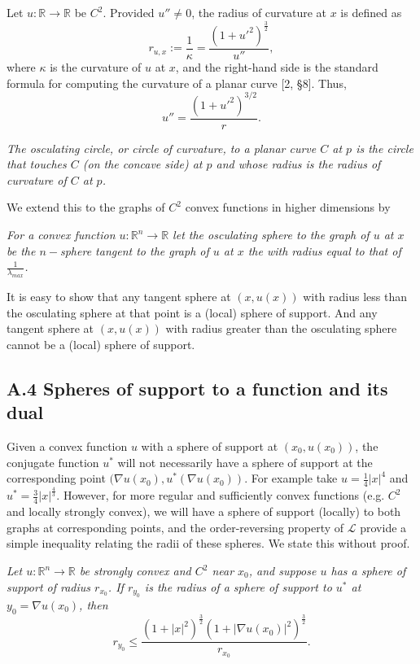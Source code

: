 \documentclass[10pt]{article}
\newenvironment{proposition}[2][Proposition]{\begin{trivlist}
\item[\hskip \labelsep {\bfseries #1}\hskip \labelsep {\bfseries #2.}]}{\end{trivlist}}
\newenvironment{definition}[2][Definition]{\begin{trivlist}
\item[\hskip \labelsep {\bfseries #1}\hskip \labelsep {\bfseries #2.}]}{\end{trivlist}}
\begin{document}
Let $u:\mathbb{R}\rightarrow \mathbb{R}$ be $C^{2}$. Provided $u''\neq 0$, the radius of curvature at $x$ is defined as
$$r_{u,x}:= \dfrac{1}{\kappa}= \dfrac{(1 + u'^{2})^{\frac{3}{2}}}{u''},$$
where $\kappa$ is the curvature of $u$ at $x$, and the right-hand side is the standard formula for computing the curvature of a planar curve [2, \S 8]. Thus, $$u''=\frac{(1+ u'^2)^{3/2}}{r}.$$

\begin{definition}{A.3}
\textit{The osculating circle, or circle of curvature, to a planar curve $C$ at $p$ is the circle that touches $C$ (on the concave side) at $p$ and whose radius is the radius of curvature of $C$ at $p$.} 
\end{definition}
We extend this to the graphs of $C^2$ convex functions in higher dimensions by
\begin{definition}{A.4}
\textit{For a convex function $u:\mathbb{R}^{n}\rightarrow \mathbb{R}$ let the osculating sphere to the graph of $u$ at $x$ be the $n-$sphere tangent to the graph of $u$ at $x$ the with radius equal to that of $\frac{1}{\lambda_{max}}$.}
\end{definition}
It is easy to show that any tangent sphere at $(x,u(x))$ with radius less than the osculating sphere at that point is a (local) sphere of support. And any tangent sphere at $(x,u(x))$ with radius greater than the osculating sphere cannot be a (local) sphere of support.
\subsection{A.4 Spheres of support to a function and its dual}
Given a convex function $u$ with a sphere of support at $(x_0, u(x_0))$, the conjugate function $u^*$ will not necessarily have a sphere of support at the corresponding point $(\nabla u(x_0), u^*(\nabla u(x_0))$. For example take $u=\frac{1}{4}|x|^4$ and $u^*=\frac{3}{4}|x|^{\frac{4}{3}}$. However, for more regular and sufficiently convex functions (e.g. $C^2$ and locally strongly convex), we will have a sphere of support (locally) to both graphs at corresponding points, and the order-reversing property of $\mathscr{L}$ provide a simple inequality relating the radii of these spheres. We state this without proof.

\begin{proposition} {A.5}
\textit{Let $u:\mathbb{R}^n \rightarrow \mathbb{R}$ be strongly convex and $C^2$ near $x_0$, and suppose $u$ has a sphere of support of radius $r_{x_0}$. If $r_{y_0}$ is the radius of a sphere of support to $u^*$ at $y_0=\nabla u(x_0)$, then
$$
r_{y_0}\leq \dfrac{\left(1+|x|^{2}\right)^{\frac{3}{2}} \left(1+|\nabla u(x_0)|^{2} \right)^{\frac{3}{2}}}{r_{x_0}}.
$$}
\end{proposition}
\end{document}
